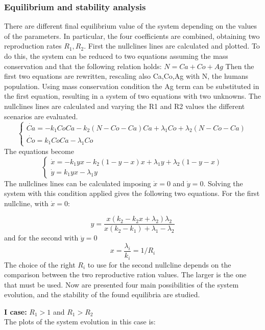 \subsubsection{Equilibrium and stability analysis}
There are different final equilibrium value of the system depending on the values of the parameters. In particular, the four coefficients are combined, obtaining two reproduction rates $R_1,R_2$. 
First the nullclines lines are calculated and plotted. To do this, the system can be reduced to two equations assuming the mass conservation and that the following relation holds:
$N=Ca+Co+Ag$
Then the first  two equations are rewritten, rescaling also Ca,Co,Ag with N, the humans population. Using mass conservation condition the Ag term can be substituted in the first equation, resulting in a system of two equations with two unknowns. 
The nullclines lines are calculated and varying the R1 and R2 values the different scenarios are evaluated. 
\[
\begin{cases}
	\dot{Ca} = -k_1 Co Ca - k_2 (N-Co-Ca) Ca + \lambda_1 Co + \lambda_2 (N-Co-Ca)\\
	\dot{Co} = k_1 Co Ca - \lambda_1 Co
\end{cases}
\]
The equations become
\[
\begin{cases}
	\dot{x} = -k_1 y x - k_2 (1-y-x) x + \lambda_1 y + \lambda_2 (1-y-x)\\
	\dot{y} = k_1 y x - \lambda_1 y
\end{cases}
\]
The nullclines lines can be calculated imposing $\dot{x} = 0$ and $\dot{y} = 0$. Solving the system with this condition applied gives the following two equations. For the first nullcline, with $\dot{x} = 0$:

\begin{equation}
 y = \frac{x(k_2 - k_2 x + \lambda_2)  \lambda_2}{x(k_2 - k_1)+ \lambda_1- \lambda_2}
\end{equation}
and for the second with $\dot{y} = 0$
\[x = \frac{\lambda_i}{k_i} = 1/R_i
\]
The choice of the right $R_i$ to use for the second nullcline depends on the comparison between the two reproductive ration values. The larger is the one that must be used. 
Now are presented four main possibilities of the system evolution, and the stability of the found equilibria are studied.

\textbf{I case:} $R_1 >1$ and $R_1> R_2$ \\
The plots of the system evolution in this case is:

